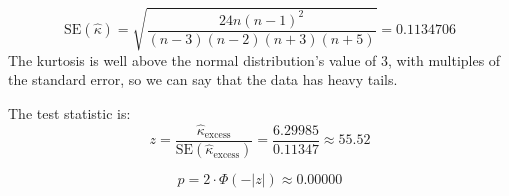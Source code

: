 \documentclass{article}
\begin{document}
$$\text{SE}(\hat{\kappa}) = \sqrt{ \frac{24n(n - 1)^2}{(n - 3)(n - 2)(n + 3)(n + 5)} } = 0.1134706$$
The kurtosis is well above the normal distribution's value of 3, with multiples of the standard error,
so we can say that the data has heavy tails.

The test statistic is:
\[
    z = \frac{ \hat{\kappa}_{\text{excess}} }{ \text{SE}(\hat{\kappa}_{\text{excess}}) } = \frac{6.29985}{0.11347} \approx 55.52
\]

\[
    p = 2 \cdot \Phi(-|z|) \approx 0.00000
\]
\end{document}
